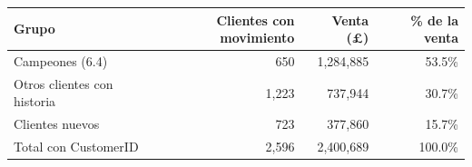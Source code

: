 \begin{tabular}{lrrr}
\toprule
Grupo & Clientes con movimiento & Venta (\pounds) & \% de la venta \\
\midrule
Campeones (6.4) & 650 & 1,284,885 & 53.5\% \\
Otros clientes con historia & 1,223 & 737,944 & 30.7\% \\
Clientes nuevos & 723 & 377,860 & 15.7\% \\
Total con CustomerID & 2,596 & 2,400,689 & 100.0\% \\
\bottomrule
\end{tabular}
